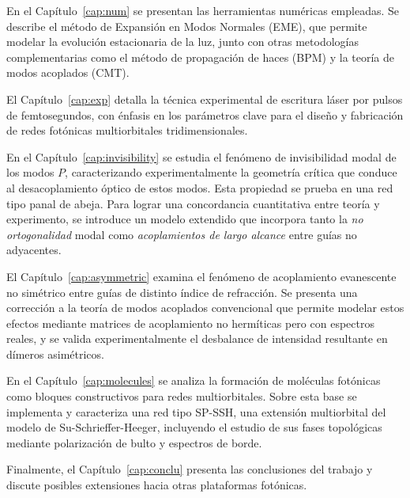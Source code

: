 En el Capítulo~\ref{cap:num} se presentan las herramientas numéricas empleadas. Se describe el método de Expansión en Modos Normales (EME), que permite modelar la evolución estacionaria de la luz, junto con otras metodologías complementarias como el método de propagación de haces (BPM) y la teoría de modos acoplados (CMT).

El Capítulo~\ref{cap:exp} detalla la técnica experimental de escritura láser por pulsos de femtosegundos, con énfasis en los parámetros clave para el diseño y fabricación de redes fotónicas multiorbitales tridimensionales.

En el Capítulo~\ref{cap:invisibility} se estudia el fenómeno de invisibilidad modal de los modos \( P \), caracterizando experimentalmente la geometría crítica que conduce al desacoplamiento óptico de estos modos. Esta propiedad se prueba en una red tipo panal de abeja. Para lograr una concordancia cuantitativa entre teoría y experimento, se introduce un modelo extendido que incorpora tanto la \textit{no ortogonalidad} modal como \textit{acoplamientos de largo alcance} entre guías no adyacentes.

El Capítulo~\ref{cap:asymmetric} examina el fenómeno de acoplamiento evanescente no simétrico entre guías de distinto índice de refracción. Se presenta una corrección a la teoría de modos acoplados convencional que permite modelar estos efectos mediante matrices de acoplamiento no hermíticas pero con espectros reales, y se valida experimentalmente el desbalance de intensidad resultante en dímeros asimétricos.

En el Capítulo~\ref{cap:molecules} se analiza la formación de moléculas fotónicas como bloques constructivos para redes multiorbitales. Sobre esta base se implementa y caracteriza una red tipo SP-SSH, una extensión multiorbital del modelo de Su-Schrieffer-Heeger, incluyendo el estudio de sus fases topológicas mediante polarización de bulto y espectros de borde.

Finalmente, el Capítulo~\ref{cap:conclu} presenta las conclusiones del trabajo y discute posibles extensiones hacia otras plataformas fotónicas.
